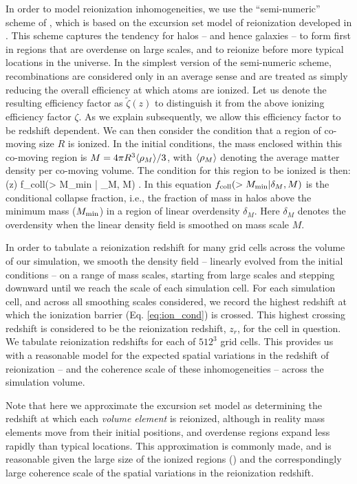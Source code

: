 In order to 
model reionization inhomogeneities, we use the ``semi-numeric'' scheme of \citet{Zahn:2006sg}, which is based on the excursion set model of reionization developed
in \citet{Furlanetto:2004nh}.
This scheme captures the tendency for halos -- and hence galaxies -- to form first in
regions that are overdense on large scales, and to reionize before more typical locations in the universe. In the simplest version of the semi-numeric
scheme, recombinations are considered only in an average sense and are treated as simply reducing the overall efficiency at which atoms are ionized. Let us denote the resulting efficiency factor as $\tilde{\zeta}(z)$ to distinguish it from the above ionizing efficiency factor $\zeta$.
As we explain subsequently, we allow this efficiency factor to be redshift dependent. We can then consider the condition that
a region of co-moving size $R$ is ionized. In the initial conditions, the mass enclosed within this co-moving region is 
$M=4 \pi R^3 \langle \rho_M \rangle/3$, with $\langle \rho_M \rangle$ denoting the average matter density per co-moving volume. The condition for this
region to be ionized is then:
\beqa
\tilde{\zeta}(z) f_{\rm coll}(> M_{\rm min} | \delta_M, M) .
\label{eq:ion_cond}
\eeqa
In this equation $f_{\rm coll}(> M_{\rm min} | \delta_M, M)$ is the conditional collapse fraction, i.e., the fraction of mass in halos
above the minimum mass ($M_{\rm min}$) in a region of linear overdensity $\delta_M$. Here $\delta_M$ denotes the overdensity when the
linear density field is smoothed on mass scale $M$. 

In order to tabulate a reionization redshift for many grid cells across the volume
of our simulation, we smooth the density field -- linearly evolved from the initial conditions -- on a range of mass scales, starting from large scales and stepping downward until
we reach the scale of each simulation cell. For each simulation cell, and across all smoothing scales considered, we record
the highest redshift at which the ionization barrier (Eq. \ref{eq:ion_cond}) is crossed. This highest crossing redshift is considered
to be the reionization redshift, $z_r$, for the cell in question. We tabulate reionization redshifts for each 
of $512^3$ grid cells. This provides us with a reasonable model for the expected spatial variations in the redshift of 
reionization -- and the coherence scale of these inhomogeneities -- across the simulation volume. 

Note that here we approximate the excursion set model as determining the redshift at which each {\em volume element} is reionized, although
in reality mass elements move from their initial positions, and overdense regions expand less rapidly than typical locations. This approximation
is commonly made, and is reasonable given the large size of the ionized regions (\citealt{Furlanetto:2004nh}) and the correspondingly large coherence scale of
the spatial variations in the reionization redshift.

